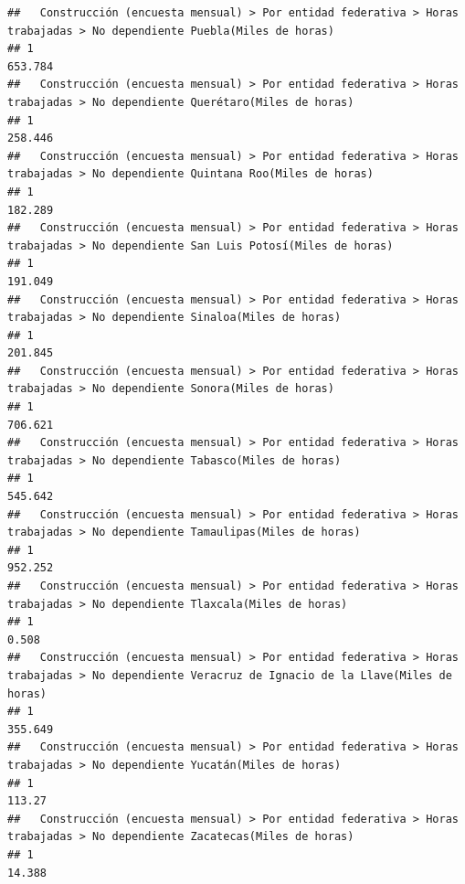 \documentclass[
]{article}
\begin{document}
\begin{verbatim}
##   Construcción (encuesta mensual) > Por entidad federativa > Horas trabajadas > No dependiente Puebla(Miles de horas) 
## 1                                                                                                              653.784
##   Construcción (encuesta mensual) > Por entidad federativa > Horas trabajadas > No dependiente Querétaro(Miles de horas) 
## 1                                                                                                                 258.446
##   Construcción (encuesta mensual) > Por entidad federativa > Horas trabajadas > No dependiente Quintana Roo(Miles de horas) 
## 1                                                                                                                    182.289
##   Construcción (encuesta mensual) > Por entidad federativa > Horas trabajadas > No dependiente San Luis Potosí(Miles de horas) 
## 1                                                                                                                       191.049
##   Construcción (encuesta mensual) > Por entidad federativa > Horas trabajadas > No dependiente Sinaloa(Miles de horas) 
## 1                                                                                                               201.845
##   Construcción (encuesta mensual) > Por entidad federativa > Horas trabajadas > No dependiente Sonora(Miles de horas) 
## 1                                                                                                              706.621
##   Construcción (encuesta mensual) > Por entidad federativa > Horas trabajadas > No dependiente Tabasco(Miles de horas) 
## 1                                                                                                               545.642
##   Construcción (encuesta mensual) > Por entidad federativa > Horas trabajadas > No dependiente Tamaulipas(Miles de horas) 
## 1                                                                                                                  952.252
##   Construcción (encuesta mensual) > Por entidad federativa > Horas trabajadas > No dependiente Tlaxcala(Miles de horas) 
## 1                                                                                                                  0.508
##   Construcción (encuesta mensual) > Por entidad federativa > Horas trabajadas > No dependiente Veracruz de Ignacio de la Llave(Miles de horas) 
## 1                                                                                                                                       355.649
##   Construcción (encuesta mensual) > Por entidad federativa > Horas trabajadas > No dependiente Yucatán(Miles de horas) 
## 1                                                                                                                113.27
##   Construcción (encuesta mensual) > Por entidad federativa > Horas trabajadas > No dependiente Zacatecas(Miles de horas) 
## 1                                                                                                                  14.388
\end{verbatim}
\end{document}
